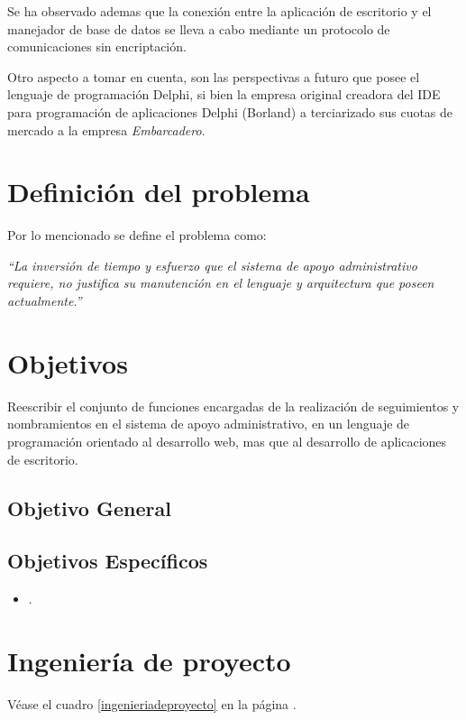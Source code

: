 \documentclass[letterpaper,11pt]{article}
\begin{document}
Se ha observado ademas que la conexión entre la aplicación de escritorio y el
manejador de base de datos se lleva a cabo mediante un protocolo de
comunicaciones sin encriptación.

Otro aspecto a tomar en cuenta, son las perspectivas a futuro que posee el
lenguaje de programación Delphi, si bien la empresa original creadora del IDE
para programación de aplicaciones Delphi (Borland) a terciarizado sus cuotas de
mercado a la empresa \emph{Embarcadero}.

\section{Definición del problema}



Por lo mencionado se define el problema como:

\emph{“La inversión de tiempo y esfuerzo que el sistema de apoyo administrativo
requiere, no justifica su manutención en el lenguaje y arquitectura que poseen
actualmente.”}

\section{Objetivos}
Reescribir el conjunto de funciones encargadas de la realización de
seguimientos y nombramientos en el sistema de apoyo administrativo, en un
lenguaje de programación orientado al desarrollo web, mas que al desarrollo de
aplicaciones de escritorio.

\subsection{Objetivo General}

\subsection{Objetivos Específicos}
\begin{itemize}
\item .
\end{itemize}

\section{Ingeniería de proyecto}
Véase el cuadro \ref{ingenieriadeproyecto} en la página \pageref{ingenieriadeproyecto}.
\end{document}
